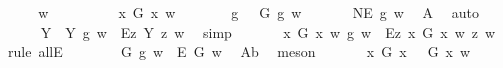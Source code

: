 \begin{isabellebody}
%
\isadelimproof
%
\endisadelimproof
%
\isatagproof
{}\isamarkupfalse%
\ {\isacharminus}\isanewline
\isacommand{{\isacharbraceleft}}\isamarkupfalse%
\isanewline
\ \ \isamarkupfalse%
\ w\ \isanewline
\ \ \isacommand{{\isacharbraceleft}}\isamarkupfalse%
\isanewline
\ \ \ \ \isamarkupfalse%
\ {\isachardoublequoteopen}{\isasymexists}x{\isachardot}\ G\ x\ w{\isachardoublequoteclose}\isanewline
\ \ \ \ \isamarkupfalse%
\ \isamarkupfalse%
\ g\ \ {}{\isacharcolon}\ {\isachardoublequoteopen}G\ g\ w{\isachardoublequoteclose}\ \isacommand{{\isachardot}{\isachardot}}\isamarkupfalse%
\isanewline
\ \ \ \ \isamarkupfalse%
\ {\isachardoublequoteopen}NE\ g\ w{\isachardoublequoteclose}\ \isamarkupfalse%
\ A{}\ \isamarkupfalse%
\ auto\isanewline
\ \ \ \ \isamarkupfalse%
\ {\isachardoublequoteopen}{\isasymforall}Y{\isachardot}\ {\isacharparenleft}{\isasymE}\ Y\ g\ w{\isacharparenright}\ {\isasymlongrightarrow}\ {\isacharparenleft}\isactrlbold {\isasymbox}{\isacharparenleft}\isactrlbold {\isasymexists}\isactrlsup Ez{\isachardot}\ {\isasymlparr}Y\ z{\isasymrparr}{\isacharparenright}{\isacharparenright}\ w{\isachardoublequoteclose}\ \isamarkupfalse%
\ simp\isanewline
\ \ \ \ \isamarkupfalse%
\ {\isachardoublequoteopen}{\isacharparenleft}{\isasymE}\ {\isacharparenleft}{\isasymlambda}x{\isachardot}\ G\ x\ w{\isacharparenright}\ g\ w{\isacharparenright}\ {\isasymlongrightarrow}\ {\isacharparenleft}\isactrlbold {\isasymbox}{\isacharparenleft}\isactrlbold {\isasymexists}\isactrlsup Ez{\isachardot}\ {\isasymlparr}{\isacharparenleft}{\isasymlambda}x{\isachardot}\ G\ x\ w{\isacharparenright}\ z{\isasymrparr}{\isacharparenright}{\isacharparenright}\ w{\isachardoublequoteclose}\ \isamarkupfalse%
\ {\isacharparenleft}rule\ allE{\isacharparenright}\isanewline
\ \ \ \ \isamarkupfalse%
\ {}{\isacharcolon}\ {\isachardoublequoteopen}{\isacharparenleft}{\isacharparenleft}{\isasymE}\ {\isasymdown}G{\isacharparenright}\ g\ w{\isacharparenright}\ {\isasymlongrightarrow}\ {\isacharparenleft}\isactrlbold {\isasymbox}{\isacharparenleft}\isactrlbold {\isasymexists}\isactrlsup E\ G{\isacharparenright}{\isacharparenright}\ w{\isachardoublequoteclose}\ \isamarkupfalse%
\ A{}b\ \isamarkupfalse%
\ meson\isanewline
\ \ \ \ \isamarkupfalse%
\ \ {\isachardoublequoteopen}{\isacharparenleft}\isactrlbold {\isasymforall}x{\isachardot}\ G\ x\ \isactrlbold {\isasymrightarrow}\ {\isacharparenleft}{\isacharparenleft}{\isasymE}\ {\isasymdown}G{\isacharparenright}\ x{\isacharparenright}{\isacharparenright}\ w{\isachardoublequoteclose}\ \isamarkupfalse%

\end{isabellebody}
